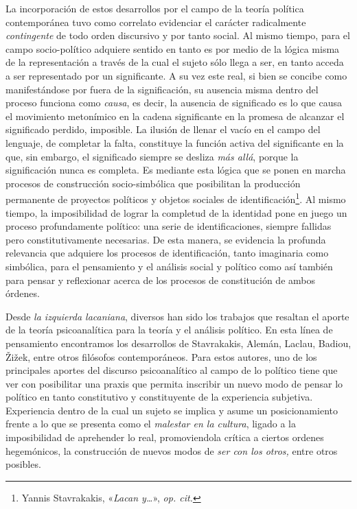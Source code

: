 La incorporación de estos desarrollos por el campo de la teoría política contemporánea tuvo como correlato evidenciar el carácter radicalmente \emph{contingente} de todo orden discursivo y por tanto social. Al mismo tiempo, para el campo socio-político adquiere sentido en tanto es por medio de la lógica misma de la representación a través de la cual el sujeto sólo llega a ser, en tanto acceda a ser representado por un significante. A su vez este real, si bien se concibe como manifestándose por fuera de la significación, su ausencia misma dentro del proceso funciona como \emph{causa}, es decir, la ausencia de significado es lo que causa el movimiento metonímico en la cadena significante en la promesa de alcanzar el significado perdido, imposible. La ilusión de llenar el vacío en el campo del lenguaje, de completar la falta, constituye la función activa del significante en la que, sin embargo, el significado siempre se desliza \emph{más allá}, porque la significación nunca es completa. Es mediante esta lógica que se ponen en marcha procesos de construcción socio-simbólica que posibilitan la producción permanente de proyectos políticos y objetos sociales de identificación\footnote{Yannis Stavrakakis, «\emph{Lacan y\ldots{}}», \emph{op. cit.}}. Al mismo tiempo, la imposibilidad de lograr la completud de la identidad pone en juego un proceso profundamente político: una serie de identificaciones, siempre fallidas pero constitutivamente necesarias. De esta manera, se evidencia la profunda relevancia que adquiere los procesos de identificación, tanto imaginaria como simbólica, para el pensamiento y el análisis social y político como así también para pensar y reflexionar acerca de los procesos de constitución de ambos órdenes.

Desde \emph{la izquierda lacaniana}, diversos han sido los trabajos que resaltan el aporte de la teoría psicoanalítica para la teoría y el análisis político. En esta línea de pensamiento encontramos los desarrollos de Stavrakakis, Alemán, Laclau, Badiou, Žižek, entre otros filósofos contemporáneos. Para estos autores, uno de los principales aportes del discurso psicoanalítico al campo de lo político tiene que ver con posibilitar una praxis que permita inscribir un nuevo modo de pensar lo político en tanto constitutivo y constituyente de la experiencia subjetiva. Experiencia dentro de la cual un sujeto se implica y asume un posicionamiento frente a lo que se presenta como el \emph{malestar en la cultura}, ligado a la imposibilidad de aprehender lo real, promoviendola crítica a ciertos ordenes hegemónicos, la construcción de nuevos modos de \emph{ser con los otros,} entre otros posibles.

